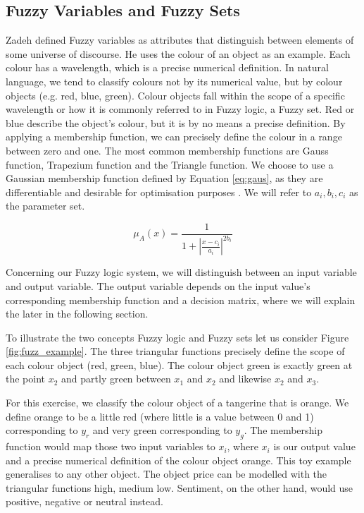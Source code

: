 \subsection {Fuzzy Variables and Fuzzy Sets }

Zadeh \cite{Zadeh65}  defined Fuzzy variables as attributes that distinguish between elements of some universe of discourse. He uses the colour of an object as an example. Each colour has a wavelength, which is a precise numerical definition. In natural language, we tend to classify colours not by its numerical value, but by colour objects (e.g. red, blue, green). Colour objects fall within the scope of a specific wavelength or how it is commonly referred to in Fuzzy logic,  a Fuzzy set. Red or blue describe the object's colour, but it is by no means a precise definition. By applying a membership function, we can precisely define the colour in a range between zero and one. The most common membership functions are Gauss function, Trapezium function and the Triangle function. We choose to use a Gaussian membership function defined by Equation \ref{eq:gaus},  as they are differentiable and desirable for optimisation purposes \cite{wu12}. We will refer to $a_i, b_i, c_i$ as the parameter set.  

\begin{equation} \label{eq:gaus}
\mu_A(x) =  \frac{1}{ 1 + |\frac{x- c_i }{a_i}|^{2b_i}  }\end{equation}


Concerning our Fuzzy logic system, we will distinguish between an input variable and output variable. The output variable depends on the input value's corresponding membership function and a decision matrix, where we will explain the later in the following section. 

 To illustrate the two concepts Fuzzy logic and Fuzzy sets let us consider Figure \ref{fig:fuzz_example}. The three triangular functions precisely define the scope of each colour object (red, green, blue). The colour object green is exactly green at the point $x_2$ and partly green between $x_1$ and $x_2$ and likewise $x_2$ and $x_3$. 
 
For this exercise, we classify the colour object of a tangerine that is orange.  We define orange to be a little red (where little is a value between 0 and 1) corresponding to $y_r$ and very green corresponding to $y_g$.  The membership function would map those two input variables to $x_i$, where $x_i$ is our output value and a precise numerical definition of the colour object orange. This toy example generalises to any other object. The object price can be modelled with the triangular functions high, medium low. Sentiment, on the other hand, would use positive, negative or neutral instead. 






